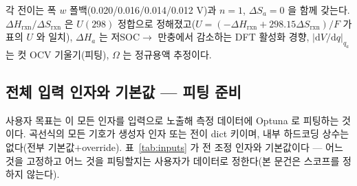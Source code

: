 \documentclass[11pt,a4paper]{article}
\newcommand{\dd}{\mathrm{d}}
\newcommand{\rxn}{\mathrm{rxn}}
\begin{document}
각 전이는 폭 $w$ 폴백(0.020/0.016/0.014/0.012 V)과 $n=1$, $\Delta S_a=0$ 을 함께 갖는다. $\Delta H_\rxn/\Delta S_\rxn$
은 $U(298)$ 정합으로 정해졌고($U=(-\Delta H_\rxn+298.15\Delta S_\rxn)/F$ 가 표의 $U$ 와 일치), $\Delta H_a$ 는 저SOC$\to$
만충에서 감소하는 DFT 활성화 경향, $|\dd V/\dd q|_{q_a}$ 는 컷 OCV 기울기(피팅), $\Omega$ 는 정규용액 추정이다.

\subsection{전체 입력 인자와 기본값 — 피팅 준비}
사용자 목표는 이 모든 인자를 입력으로 노출해 측정 데이터에 Optuna 로 피팅하는 것이다. 곡선식의 모든 기호가 생성자 인자
또는 전이 dict 키이며, 내부 하드코딩 상수는 없다(전부 기본값$+$override). 표~\ref{tab:inputs} 가 전 조정 인자와
기본값이다 --- 어느 것을 고정하고 어느 것을 피팅할지는 사용자가 데이터로 정한다(본 문건은 스코프를 정하지 않는다).
\end{document}
